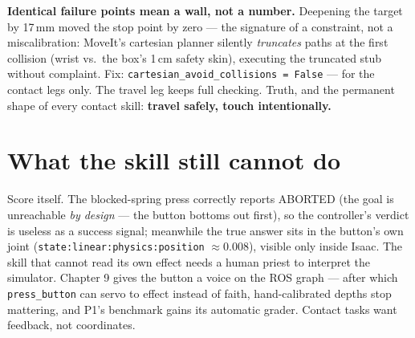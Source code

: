 \begin{lesson}
\textbf{Identical failure points mean a wall, not a number.} Deepening the target by 17\,mm
moved the stop point by zero --- the signature of a constraint, not a miscalibration: MoveIt's
cartesian planner silently \emph{truncates} paths at the first collision (wrist vs.\ the box's
1\,cm safety skin), executing the truncated stub without complaint. Fix:
\texttt{cartesian\_avoid\_collisions = False} --- for the contact legs only. The travel leg
keeps full checking. Truth, and the permanent shape of every contact skill: \textbf{travel
safely, touch intentionally.}
\end{lesson}

\section{What the skill still cannot do}

Score itself. The blocked-spring press correctly reports ABORTED (the goal is unreachable
\emph{by design} --- the button bottoms out first), so the controller's verdict is useless as a
success signal; meanwhile the true answer sits in the button's own joint
(\texttt{state:linear:physics:position} $\approx 0.008$), visible only inside Isaac. The skill
that cannot read its own effect needs a human priest to interpret the simulator. Chapter 9
gives the button a voice on the ROS graph --- after which \texttt{press\_button} can servo to
effect instead of faith, hand-calibrated depths stop mattering, and P1's benchmark gains its
automatic grader. Contact tasks want feedback, not coordinates.
